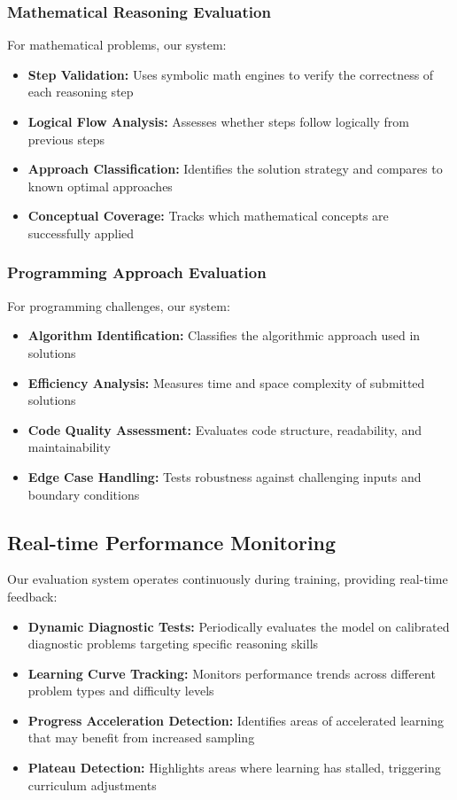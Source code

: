\subsubsection{Mathematical Reasoning Evaluation}

For mathematical problems, our system:

\begin{itemize}
    \item \textbf{Step Validation:} Uses symbolic math engines to verify the correctness of each reasoning step
    \item \textbf{Logical Flow Analysis:} Assesses whether steps follow logically from previous steps
    \item \textbf{Approach Classification:} Identifies the solution strategy and compares to known optimal approaches
    \item \textbf{Conceptual Coverage:} Tracks which mathematical concepts are successfully applied
\end{itemize}

\subsubsection{Programming Approach Evaluation}

For programming challenges, our system:

\begin{itemize}
    \item \textbf{Algorithm Identification:} Classifies the algorithmic approach used in solutions
    \item \textbf{Efficiency Analysis:} Measures time and space complexity of submitted solutions
    \item \textbf{Code Quality Assessment:} Evaluates code structure, readability, and maintainability
    \item \textbf{Edge Case Handling:} Tests robustness against challenging inputs and boundary conditions
\end{itemize}

\subsection{Real-time Performance Monitoring}

Our evaluation system operates continuously during training, providing real-time feedback:

\begin{itemize}
    \item \textbf{Dynamic Diagnostic Tests:} Periodically evaluates the model on calibrated diagnostic problems targeting specific reasoning skills
    \item \textbf{Learning Curve Tracking:} Monitors performance trends across different problem types and difficulty levels
    \item \textbf{Progress Acceleration Detection:} Identifies areas of accelerated learning that may benefit from increased sampling
    \item \textbf{Plateau Detection:} Highlights areas where learning has stalled, triggering curriculum adjustments
\end{itemize}

